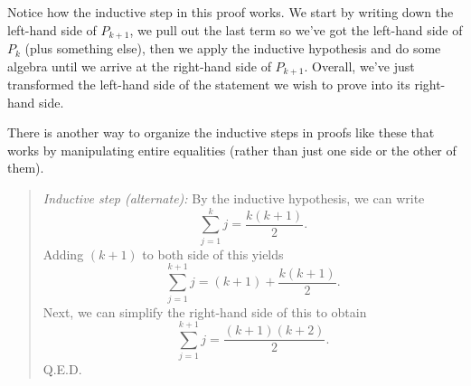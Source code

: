 \documentclass[10pt,]{book}
\theoremstyle{plain}
\theoremstyle{definition}
\theoremstyle{definition}
\numberwithin{equation}{section}
\begin{document}
    Notice how the inductive step in this proof works. We start by writing
    down the left-hand side of \(P_{k+1}\), we pull out the last term
    so we've got the left-hand side of \(P_{k}\) (plus something else), then
    we apply the inductive hypothesis and do some algebra until we arrive
    at the right-hand side of \(P_{k+1}\). Overall, we've just transformed the
    left-hand side of the statement we wish to prove into its right-hand side.
\par

    There is another way to organize the inductive steps in proofs like these
    that works by manipulating entire equalities (rather than just one side
    or the other of them).
\begin{quote}\emph{Inductive step (alternate): }  By the inductive 
  hypothesis, we can write
  \begin{equation*}
    \sum_{j=1}^{k} j = \frac{k(k+1)}{2}.
  \end{equation*}
  Adding \((k+1)\) to both side of this yields
  \begin{equation*}
    \sum_{j=1}^{k+1} j = (k+1) + \frac{k(k+1)}{2}.
  \end{equation*}
  Next, we can simplify the right-hand side of this to obtain
  \begin{equation*}
    \sum_{j=1}^{k+1} j = \frac{(k+1)(k+2)}{2}.
  \end{equation*}
  Q.E.D.
  \end{quote}
\par
\end{document}
